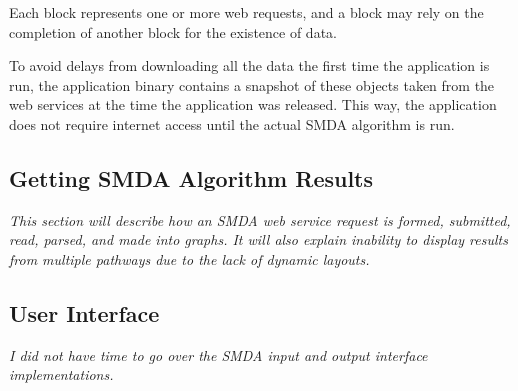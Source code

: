 Each block represents one or more web requests, and a block may rely on the
completion of another block for the existence of data.

To avoid delays from downloading all the data the first time the application is
run, the application binary contains a snapshot of these objects taken from the
web services at the time the application was released. This way, the application
does not require internet access until the actual SMDA algorithm is run.

\subsection{Getting SMDA Algorithm Results}
\label{sect:smda_results_request}

\emph{This section will describe how an SMDA web service request is formed,
submitted, read, parsed, and made into graphs. It will also explain \mawappp
inability to display results from multiple pathways due to the lack of dynamic
layouts.}

\subsection{User Interface}
\label{sect:smda_results_ui}

\emph{I did not have time to go over the SMDA input and output interface
implementations.}
